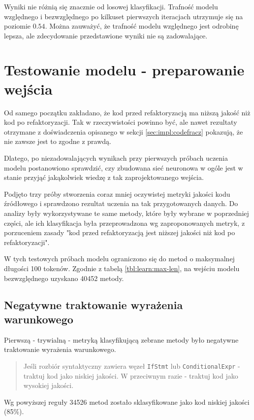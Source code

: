 \documentclass[12pt]{report}
\begin{document}
Wyniki nie różnią się znacznie od losowej klasyfikacji. Trafność modelu względnego i bezwzględnego po kilkuset pierwszych iteracjach utrzymuje się na poziomie $0.54$. Można zauważyć, że trafność modelu względnego jest odrobinę lepsza, ale zdecydowanie przedstawione wyniki nie są zadowalające.

\section{Testowanie modelu - preparowanie wejścia}
Od samego początku zakładano, że kod przed refaktoryzacją ma niższą jakość niż kod po refaktoryzacji. Tak w rzeczywistości powinno być, ale nawet rezultaty otrzymane z doświadczenia opisanego w sekcji \ref{sec:impl:codefracz} pokazują, że nie zawsze jest to zgodne z prawdą.

Dlatego, po niezadowalających wynikach przy pierwszych próbach uczenia modelu postanowiono sprawdzić, czy zbudowana sieć neuronowa w ogóle jest w stanie przyjąć jakąkolwiek wiedzę z tak zaprojektowanego wejścia.

Podjęto trzy próby stworzenia coraz mniej oczywistej metryki jakości kodu źródłowego i sprawdzono rezultat uczenia na tak przygotowanych danych. Do analizy były wykorzystywane te same metody, które były wybrane w poprzedniej części, ale ich klasyfikacja była przeprowadzona wg zaproponowanych metryk, z porzuceniem zasady "kod przed refaktoryzacją jest niższej jakości niż kod po refaktoryzacji".

W tych testowych próbach modelu ograniczono się do metod o maksymalnej długości 100 tokenów. Zgodnie z tabelą \ref{tbl:learn:max-len}, na wejściu modelu bezwzględnego uzyskano 40452 metody.

\subsection{Negatywne traktowanie wyrażenia warunkowego}

Pierwszą - trywialną - metryką klasyfikującą zebrane metody było negatywne traktowanie wyrażenia warunkowego.

\begin{quotation}
\noindent Jeśli rozbiór syntaktyczny zawiera węzeł \texttt{IfStmt} lub \texttt{ConditionalExpr} - traktuj kod jako niskiej jakości. W przeciwnym razie - traktuj kod jako wysokiej jakości.
\end{quotation}

Wg powyższej reguły 34526 metod zostało sklasyfikowane jako kod niskiej jakości (85\%).
\end{document}
